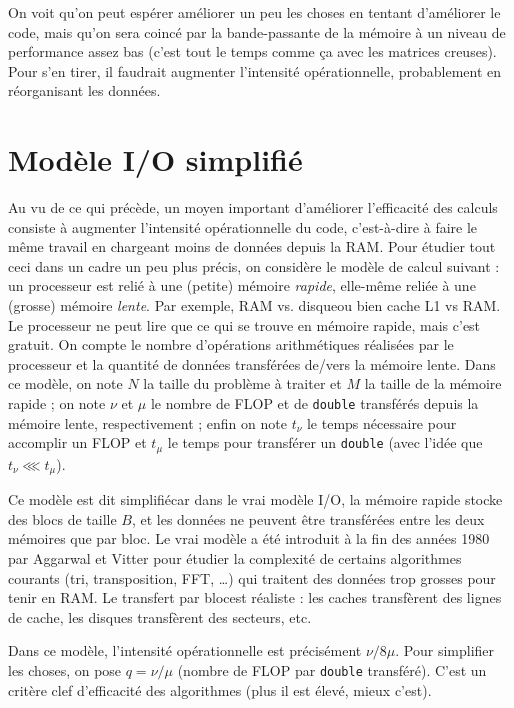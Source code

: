 On voit qu'on peut espérer améliorer un peu les choses en tentant d'améliorer le
code, mais qu'on sera coincé par la bande-passante de la mémoire à un niveau de
performance assez bas (c'est tout le temps comme ça avec les matrices
creuses). Pour s'en tirer, il faudrait augmenter l'intensité opérationnelle,
probablement en réorganisant les données.

\section{Modèle I/O simplifié}

Au vu de ce qui précède, un moyen important d'améliorer l'efficacité des calculs
consiste à augmenter l'intensité opérationnelle du code, c'est-à-dire à faire le
même travail en chargeant moins de données depuis la RAM. Pour étudier tout ceci
dans un cadre un peu plus précis, on considère le modèle de calcul suivant : un
processeur est relié à une (petite) mémoire \emph{rapide}, elle-même reliée à
une (grosse) mémoire \emph{lente}. Par exemple, \og RAM vs. disque\fg ou bien
\og cache L1 vs RAM\fg. Le processeur ne peut lire que ce qui se trouve en
mémoire rapide, mais c'est \og gratuit\fg. On compte le nombre d'opérations
arithmétiques réalisées par le processeur et la quantité de données transférées
de/vers la mémoire lente. Dans ce modèle, on note $N$ la taille du problème à
traiter et $M$ la taille de la mémoire rapide ; on note $\nu$ et $\mu$ le nombre
de FLOP et de \texttt{double} transférés depuis la mémoire lente, respectivement
; enfin on note $t_\nu$ le temps nécessaire pour accomplir un FLOP et $t_\mu$ le
temps pour transférer un \texttt{double} (avec l'idée que $t_\nu \lll t_\mu$).

\begin{danger}
  Ce modèle est dit \og simplifié\fg car dans le vrai modèle I/O, la mémoire
  rapide stocke des blocs de taille $B$, et les données ne peuvent être
  transférées entre les deux mémoires que par bloc. Le vrai modèle a été
  introduit à la fin des années 1980 par Aggarwal et Vitter pour étudier la
  complexité de certains algorithmes courants (tri, transposition, FFT, \dots)
  qui traitent des données trop grosses pour tenir en RAM. Le transfert \og par
  bloc\fg est réaliste : les caches transfèrent des lignes de cache, les disques
  transfèrent des secteurs, etc.
\end{danger}

Dans ce modèle, l'intensité opérationnelle est précisément $\nu / 8\mu$. Pour
simplifier les choses, on pose $q = \nu / \mu$ (nombre de FLOP par
\texttt{double} transféré). C'est un critère clef d'efficacité des algorithmes
(plus il est élevé, mieux c'est).

